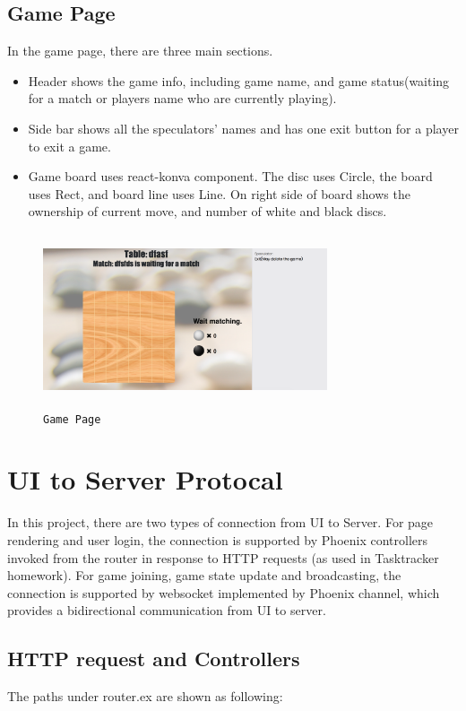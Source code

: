 \subsection{Game Page}
In the game page, there are three main sections.
\begin{itemize}
  \item Header shows the game info, including game name, and game status(waiting
  for a match or players name who are currently playing).
  \item Side bar shows all the speculators' names and has one exit button for 
  a player to exit a game.
  \item Game board uses react-konva component. The disc uses Circle, the board 
  uses Rect, and board line uses Line. On right side of board shows the ownership
  of current move, and number of white and black discs.

\end{itemize}
\begin{figure}[!htb]
\includegraphics[height=2.0in, width=3.3in]{game.png}
\caption{\texttt{Game Page}}
\end{figure}
\section{UI to Server Protocal}
In this project, there are two types of connection from UI to Server. For page 
rendering and user login, the connection is supported by Phoenix controllers 
invoked from the router in response to HTTP requests (as used in Tasktracker 
homework). For game joining, game state update and broadcasting, the connection 
is supported by websocket implemented by Phoenix channel, which provides a 
bidirectional communication from UI to server.

\subsection{HTTP request and Controllers}
The paths under router.ex are shown as following:

